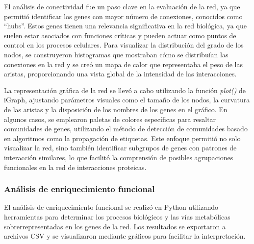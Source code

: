 El análisis de conectividad fue un paso clave en la evaluación de la red, ya que permitió identificar los genes con mayor número de conexiones, conocidos como “hubs”. Estos genes tienen una relevancia significativa en la red biológica, ya que suelen estar asociados con funciones críticas y pueden actuar como puntos de control en los procesos celulares. Para visualizar la distribución del grado de los nodos, se construyeron histogramas que mostraban cómo se distribuían las conexiones en la red y se creó un mapa de calor que representaba el peso de las aristas, proporcionando una vista global de la intensidad de las interacciones.

La representación gráfica de la red se llevó a cabo utilizando la función \textit{plot()} de iGraph, ajustando parámetros visuales como el tamaño de los nodos, la curvatura de las aristas y la disposición de los nombres de los genes en el gráfico. En algunos casos, se emplearon paletas de colores específicas para resaltar comunidades de genes, utilizando el método de detección de comunidades basado en algoritmos como la propagación de etiquetas. Este enfoque permitió no solo visualizar la red, sino también identificar subgrupos de genes con patrones de interacción similares, lo que facilitó la comprensión de posibles agrupaciones funcionales en la red de interacciones proteicas.

\subsubsection{\textbf{Análisis de enriquecimiento funcional}}

El análisis de enriquecimiento funcional se realizó en Python utilizando herramientas para determinar los procesos biológicos y las vías metabólicas sobrerrepresentadas en los genes de la red. Los resultados se exportaron a archivos CSV y se visualizaron mediante gráficos para facilitar la interpretación.







